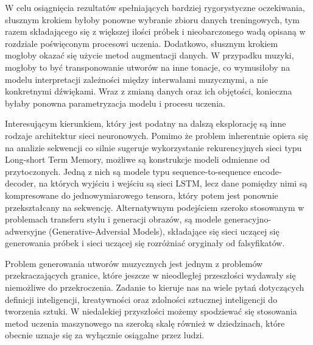 {    W celu osiągnięcia rezultatów spełniających bardziej rygorystyczne oczekiwania, słusznym krokiem byłoby
    ponowne wybranie zbioru danych treningowych, tym razem składającego się z większej ilości próbek i nieobarczonego
    wadą opisaną w rozdziale poświęconym procesowi uczenia. 
    Dodatkowo, słusznym krokiem mogłoby okazać się użycie metod augmentacji danych. W przypadku muzyki, mogłoby to
    być transponowanie utworów na inne tonacje, co wymusiłoby na modelu interpretacji zależności między interwałami
    muzycznymi, a nie konkretnymi dźwiękami.
    Wraz z zmianą danych oraz ich objętości, konieczna byłaby ponowna parametryzacja modelu i procesu uczenia.

    Interesującym kierunkiem, który jest podatny na dalszą eksplorację są inne rodzaje architektur sieci neuronowych.
    Pomimo że problem inherentnie opiera się na analizie sekwencji co silnie sugeruje wykorzystanie rekurencyjnych 
    sieci typu Long-short Term Memory, możliwe są konstrukcje modeli odmienne od przytoczonych. Jedną z nich są modele typu 
    sequence-to-sequence encode-decoder, na których wyjściu i wejściu są sieci LSTM, lecz dane pomiędzy nimi są
    kompresowane do jednowymiarowego tensora, który potem jest ponownie przekształcany na sekwencję. 
    Alternatywnym podejściem szeroko stosowanym w problemach transferu stylu i generacji obrazów, 
    są modele generacyjno-adwersyjne (Generative-Adversial Models), składające się sieci uczącej się generowania 
    próbek i sieci uczącej się rozróżniać oryginały od falsyfikatów.


    Problem generowania utworów muzycznych jest jednym z problemów przekraczających granice, które
    jeszcze w nieodległej przeszłości wydawały się niemożliwe do przekroczenia. Zadanie to kieruje nas na wiele pytań 
    dotyczących definicji inteligencji, kreatywności oraz zdolności sztucznej inteligencji do tworzenia sztuki. 
    W niedalekiej przyszłości możemy spodziewać się stosowania metod uczenia maszynowego na szeroką skalę również w dziedzinach,
    które obecnie uznaje się za wyłącznie osiągalne przez ludzi. 

}
